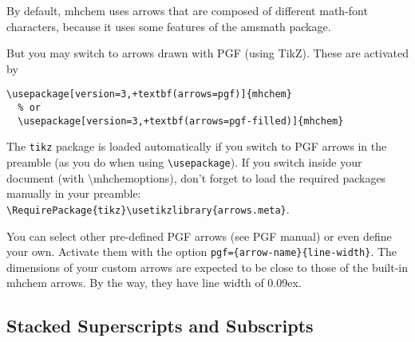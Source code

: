 \documentclass[a4paper,notitlepage,parskip=half]{scrreprt}
\newcommand\macro[1]{\mbox{\ttfamily\textbackslash#1}}
\begin{document}
By default, mhchem uses arrows that are composed of different math-font characters, because it uses some features of the amsmath package.

\begin{SideBySideExample}[xrightmargin=3cm]
\end{SideBySideExample}

But you may switch to arrows drawn with PGF (using TikZ). These are activated by

\begin{Verbatim}[commandchars=+()]
  \usepackage[version=3,+textbf(arrows=pgf)]{mhchem}
  % or
  \usepackage[version=3,+textbf(arrows=pgf-filled)]{mhchem}
\end{Verbatim}

The \verb|tikz| package is loaded automatically if you switch to PGF arrows in the preamble (as you do when using \verb|\usepackage|). If you switch inside your document (with \macro{mhchemoptions}), don't forget to load the required packages manually in your preamble: \verb|\RequirePackage{tikz}\usetikzlibrary{arrows.meta}|.

\begin{SideBySideExample}[xrightmargin=3cm]
\end{SideBySideExample}

\begin{SideBySideExample}[xrightmargin=3cm]
\end{SideBySideExample}

You can select other pre-defined PGF arrows (see PGF manual) or even define your own. Activate them with the option \verb|pgf={arrow-name}{line-width}|. The dimensions of your custom arrows are expected to be close to those of the built-in mhchem arrows. By the way, they have line width of 0.09ex.

\begin{SideBySideExample}[xrightmargin=3cm]
\end{SideBySideExample}


\subsection{Stacked Superscripts and Subscripts}

\begin{SideBySideExample}[xrightmargin=3cm]
\end{SideBySideExample}
\end{document}
